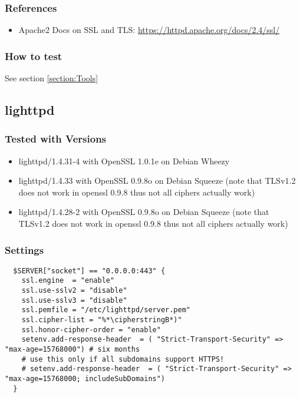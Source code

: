 \subsubsection{References}
\begin{itemize}
  \item Apache2 Docs on SSL and TLS: \url{https://httpd.apache.org/docs/2.4/ssl/}
\end{itemize}

\subsubsection{How to test}

See section \ref{section:Tools}

\subsection{lighttpd}

\subsubsection{Tested with Versions}
\begin{itemize}
  \item lighttpd/1.4.31-4 with OpenSSL 1.0.1e on Debian Wheezy
  \item lighttpd/1.4.33 with OpenSSL 0.9.8o on Debian Squeeze (note that TLSv1.2 does not work in openssl 0.9.8 thus not all ciphers actually work)
  \item lighttpd/1.4.28-2 with OpenSSL 0.9.8o on Debian Squeeze (note that TLSv1.2 does not work in openssl 0.9.8 thus not all ciphers actually work)
\end{itemize}


\subsubsection{Settings}
\begin{lstlisting}
  $SERVER["socket"] == "0.0.0.0:443" {
    ssl.engine  = "enable"
    ssl.use-sslv2 = "disable"
    ssl.use-sslv3 = "disable"
    ssl.pemfile = "/etc/lighttpd/server.pem"
    ssl.cipher-list = "%*\cipherstringB*)"
    ssl.honor-cipher-order = "enable"
    setenv.add-response-header  = ( "Strict-Transport-Security" => "max-age=15768000") # six months
    # use this only if all subdomains support HTTPS!
    # setenv.add-response-header  = ( "Strict-Transport-Security" => "max-age=15768000; includeSubDomains")
  }
\end{lstlisting}


